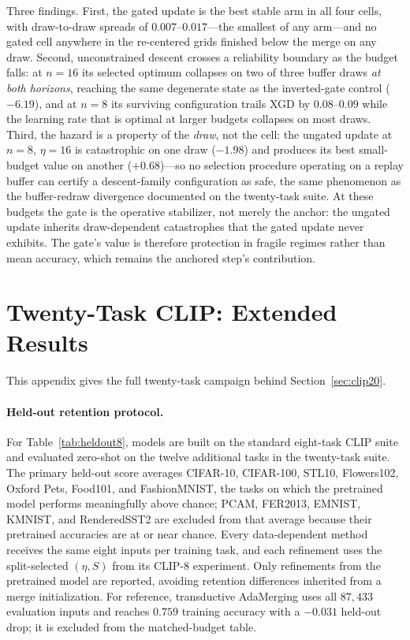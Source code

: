 \documentclass{article} %
\begin{document}
Three findings. First, the gated update is the best stable arm in all four cells, with draw-to-draw spreads of $0.007$--$0.017$---the smallest of any arm---and no gated cell anywhere in the re-centered grids finished below the merge on any draw. Second, unconstrained descent crosses a reliability boundary as the budget falls: at $n=16$ its selected optimum collapses on two of three buffer draws \emph{at both horizons}, reaching the same degenerate state as the inverted-gate control ($-6.19$), and at $n=8$ its surviving configuration trails XGD by $0.08$--$0.09$ while the learning rate that is optimal at larger budgets collapses on most draws. Third, the hazard is a property of the \emph{draw}, not the cell: the ungated update at $n=8$, $\eta=16$ is catastrophic on one draw ($-1.98$) and produces its best small-budget value on another ($+0.68$)---so no selection procedure operating on a replay buffer can certify a descent-family configuration as safe, the same phenomenon as the buffer-redraw divergence documented on the twenty-task suite. At these budgets the gate is the operative stabilizer, not merely the anchor: the ungated update inherits draw-dependent catastrophes that the gated update never exhibits. The gate's value is therefore protection in fragile regimes rather than mean accuracy, which remains the anchored step's contribution.


\fi

\section{Twenty-Task CLIP: Extended Results}
\label{app:clip20}

This appendix gives the full twenty-task campaign behind Section~\ref{sec:clip20}.

\paragraph{Held-out retention protocol.}
For Table~\ref{tab:heldout8}, models are built on the standard eight-task CLIP suite and evaluated zero-shot on the twelve additional tasks in the twenty-task suite. The primary held-out score averages CIFAR-10, CIFAR-100, STL10, Flowers102, Oxford Pets, Food101, and FashionMNIST, the tasks on which the pretrained model performs meaningfully above chance; PCAM, FER2013, EMNIST, KMNIST, and RenderedSST2 are excluded from that average because their pretrained accuracies are at or near chance. Every data-dependent method receives the same eight inputs per training task, and each refinement uses the split-selected $(\eta,S)$ from its CLIP-8 experiment. Only refinements from the pretrained model are reported, avoiding retention differences inherited from a merge initialization. For reference, transductive AdaMerging uses all $87{,}433$ evaluation inputs and reaches $0.759$ training accuracy with a $-0.031$ held-out drop; it is excluded from the matched-budget table.
\end{document}
